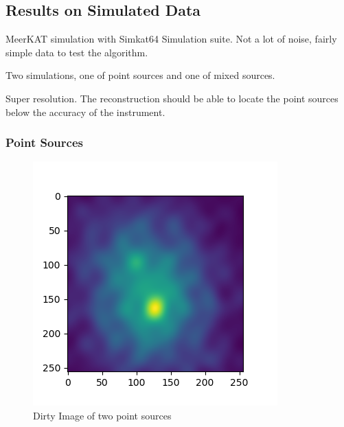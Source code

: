\subsection{Results on Simulated Data}

MeerKAT simulation with Simkat64 Simulation suite. Not a lot of noise, fairly simple data to test the algorithm.

Two simulations, one of point sources and one of mixed sources. 

Super resolution. The reconstruction should be able to locate the point sources below the accuracy of the instrument.

\subsubsection{Point Sources}

\begin{figure}[h]
	\centering
	\includegraphics[width=0.5\linewidth]{./chapters/05.algorithms/sim02/sim02_point_dirty.png}
	\caption{Dirty Image of two point sources}
	\label{alg:point:dirty}
\end{figure}

